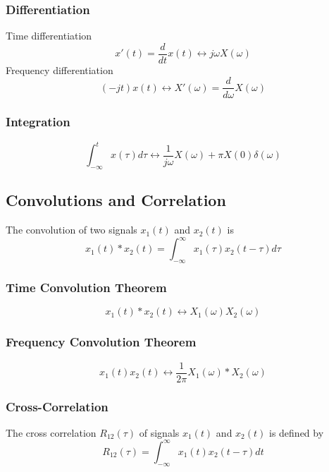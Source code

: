 \documentclass[]{article}
\begin{document}
\begin{multicols}{2}
\subsubsection{Differentiation}
Time differentiation
\begin{equation} x'(t) = \frac{d}{dt}x(t) \longleftrightarrow j\omega X(\omega)\label{fourier_time_differentiation}\end{equation}
Frequency differentiation
\begin{equation} (-jt)x(t) \longleftrightarrow X'(\omega) = \frac{d}{d\omega}X(\omega)\label{fourier_freq_differentiation} \end{equation}
\subsubsection{Integration}
\begin{equation} \int_{-\infty}^{t} x(\tau)d\tau \longleftrightarrow \frac{1}{j\omega}X(\omega) + \pi X(0)\delta(\omega)\label{fourier_integration}\end{equation}

\subsection{Convolutions and Correlation}
The convolution of two signals $x_{1}(t)$ and $x_{2}(t)$ is
\begin{equation} x_{1}(t) * x_{2}(t) = \int_{-\infty}^{\infty} x_{1}(\tau) x_{2}(t-\tau)d\tau\label{convolution_def} \end{equation}
\subsubsection{Time Convolution Theorem}
\begin{equation} x_{1}(t) * x_{2}(t) \longleftrightarrow X_{1}(\omega) X_{2}(\omega)\label{time_convolution_thrm}\end{equation} 
\subsubsection{Frequency Convolution Theorem}
\begin{equation}x_{1}(t)x_{2}(t) \longleftrightarrow \frac{1}{2\pi}X_{1}(\omega)*X_{2}(\omega)\label{freq_convolution_thrm} \end{equation}
\subsubsection{Cross-Correlation}
The cross correlation $R_{12}(\tau)$ of signals $x_{1}(t)$ and $x_{2}(t)$ is defined by
\begin{equation}R_{12}(\tau) = \int_{-\infty}^{\infty}x_{1}(t)x_{2}(t-\tau)dt\label{cross_corr_defn} \end{equation}

\end{multicols}
\end{document}

